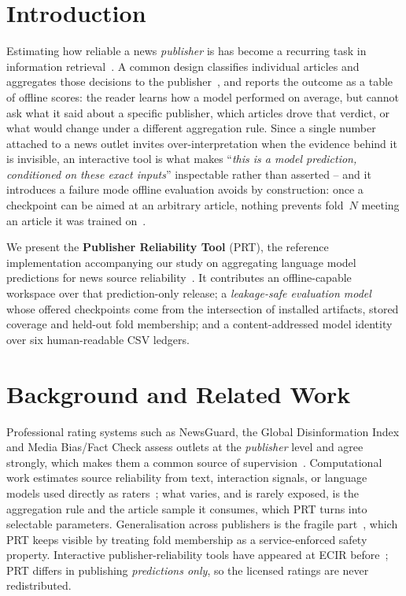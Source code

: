 \documentclass[runningheads]{llncs}
\begin{document}
\section{Introduction}
\label{sec:intro}

Estimating how reliable a news \emph{publisher} is has become a recurring task
in information retrieval~\cite{nakov2024survey,srba2025survey}. A common design
classifies individual articles and aggregates those decisions to the
publisher~\cite{burdisso2024reliability}, and reports the outcome as a table of
offline scores: the reader learns how a model performed on average, but cannot
ask what it said about a specific publisher, which articles drove that verdict,
or what would change under a different aggregation rule. Since a single number
attached to a news outlet invites over-interpretation when the evidence behind
it is invisible, an interactive tool is what makes ``\emph{this is a model
prediction, conditioned on these exact inputs}'' inspectable rather than
asserted -- and it introduces a failure mode offline evaluation avoids by
construction: once a checkpoint can be aimed at an arbitrary article, nothing
prevents fold~$N$ meeting an article it was trained
on~\cite{verhoeven2025yesterday}.

We present the \textbf{Publisher Reliability Tool} (PRT), the reference
implementation accompanying our study on aggregating language model predictions
for news source reliability~\cite{bianchi2026articles}. It contributes an
offline-capable workspace over that prediction-only release; a
\emph{leakage-safe evaluation model} whose
offered checkpoints come from the intersection of installed artifacts, stored
coverage and held-out fold membership; and a content-addressed model identity
over six human-readable CSV ledgers.

\section{Background and Related Work}
\label{sec:related}

Professional rating systems such as NewsGuard, the Global Disinformation Index
and Media Bias/Fact Check assess outlets at the \emph{publisher} level and agree
strongly, which makes them a common source of
supervision~\cite{lin2023correspondence,pratelli2022structured}. Computational
work estimates source reliability from text, interaction signals, or language
models used directly as
raters~\cite{burdisso2024reliability,yang2025accuracy,srba2025survey}; what
varies, and is rarely exposed, is the aggregation rule and the article sample
it consumes, which PRT turns into selectable parameters. Generalisation across
publishers is the fragile part~\cite{azizov2024safari,verhoeven2025yesterday},
which PRT keeps visible by treating fold membership as a service-enforced
safety property. Interactive publisher-reliability tools have appeared at ECIR
before~\cite{pratelli2025tropic}; PRT differs in publishing \emph{predictions
only}, so the licensed ratings are never redistributed.
\end{document}
